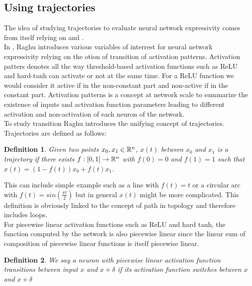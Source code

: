 \documentclass[12pt, a4paper]{article}
\newtheorem{definition}{Definition}
\begin{document}
\subsection{Using trajectories}
\label{sec:using_trajectories}

The idea of studying trajectories to evaluate neural network expressivity comes from \cite{raghu_expressive_2017} itself relying on \cite{poole_exponential_2016} and \cite{pascanu_number_2014}.\\

In \cite{raghu_expressive_2017}, Raghu introduces various variables of interrest for neural network expressivity relying on the otion of transition of activation patterns. Activation patters denotes all the way threshold-based activation functions such as ReLU and hard-tanh can activate or not at the same time. For a ReLU function we would consider it active if in the non-constant part and non-active if in the constant part. Activation patterns is a concept at network scale to summarize the existence of inputs and activation function parameters leading to different activation and non-activation of each neuron of the network.\\

To study transition Raghu introduces the unifying concept of trajectories. Trajectories are defined as follows:

\begin{definition}
  Given two points $x_0, x_1 \in \mathbb{R}^n$, $x(t)$ between $x_0$ and $x_1$ is a trajectory if there exists $f: [0,1] \to \mathbb{R}^n$ with $f(0) = 0$ and $f(1) = 1$ such that $x(t) = (1-f(t))x_0 + f(t)x_1$. 
  \label{def:trajectories}
\end{definition}

This can include simple example such as a line with $f(t) = t$ or a circular arc with $f(t) = sin(\frac{\pi t}{2})$ but in general $x(t)$ might be more complicated. This definition is obviously linked to the concept of path in topology and therefore includes loops.\\

For piecewise linear activation functions such as ReLU and hard tanh, the function computed by the network is also piecewise linear since the linear sum of composition of piecewise linear functions is itself piecewise linear.

\begin{definition}
  We say a neuron with piecewise linear activation function transitions between input $x$ and $x+\delta$ if its activation function switches between $x$ and $x+\delta$
\end{definition}
\end{document}
